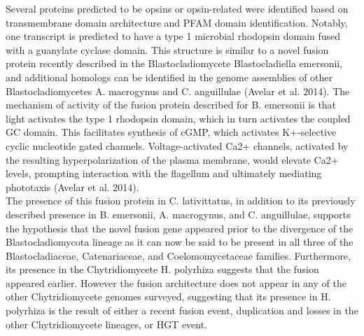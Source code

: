 \indent Several proteins predicted to be opsins or opsin-related were identified based on transmembrane domain architecture and PFAM domain identification. Notably, one transcript is predicted to have a type 1 microbial rhodopsin domain fused with a guanylate cyclase domain. This structure is similar to a novel fusion protein recently described in the Blastocladiomycete Blastocladiella emersonii, and additional homologs can be identified in the genome assemblies of other Blastocladiomycetes A. macrogynus and C.  anguillulae (Avelar et al. 2014). The mechanism of activity of the fusion protein described for B. emersonii is that light activates the type 1 rhodopsin domain, which in turn activates the coupled GC domain. This facilitates synthesis of cGMP, which activates K+-selective cyclic nucleotide gated channels. Voltage-activated Ca2+ channels, activated by the resulting hyperpolarization of the plasma membrane, would elevate Ca2+ levels, prompting interaction with the flagellum and ultimately mediating phototaxis (Avelar et al. 2014). \\
\indent The presence of this fusion protein in C. lativittatus, in addition to its previously described presence in B. emersonii, A. macrogynus, and C. anguillulae, supports the hypothesis that the novel fusion gene appeared prior to the divergence of the Blastocladiomycota lineage as it can now be said to be present in all three of the Blastocladiaceae, Catenariaceae, and Coelomomycetaceae families. Furthermore, its presence in the Chytridiomycete H. polyrhiza suggests that the fusion appeared earlier. However the fusion architecture does not appear in any of the other Chytridiomycete genomes surveyed, suggesting that its presence in H. polyrhiza is the result of either a recent fusion event, duplication and losses in the other Chytridiomycete lineages, or HGT event.\\
